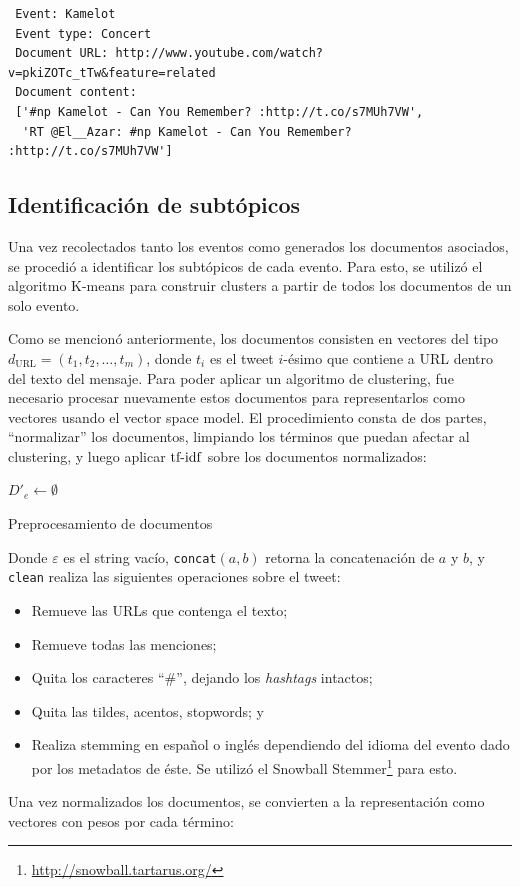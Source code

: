 \begin{verbatim}
 Event: Kamelot
 Event type: Concert
 Document URL: http://www.youtube.com/watch?v=pkiZOTc_tTw&feature=related
 Document content:
 ['#np Kamelot - Can You Remember? :http://t.co/s7MUh7VW',
  'RT @El__Azar: #np Kamelot - Can You Remember? :http://t.co/s7MUh7VW']
\end{verbatim}


\subsection{Identificación de subtópicos}
\label{sec-4.2.2}


    Una vez recolectados tanto los eventos como generados los
    documentos asociados, se procedió a identificar los subtópicos de
    cada evento. Para esto, se utilizó el algoritmo K-means para
    construir clusters a partir de todos los documentos de un solo
    evento.

    Como se mencionó anteriormente, los documentos consisten en
    vectores del tipo $d_{\textrm{URL}}=(t_1,t_2,\ldots,t_m)$, donde
    $t_i$ es el tweet $i$-ésimo que contiene a URL dentro del texto
    del mensaje. Para poder aplicar un algoritmo de clustering, fue
    necesario procesar nuevamente estos documentos para representarlos
    como vectores usando el vector space model. El procedimiento
    consta de dos partes, ``normalizar'' los documentos, limpiando los
    términos que puedan afectar al clustering, y luego aplicar
    $\operatorname{tf-idf}$ sobre los documentos normalizados:

\begin{algorithm}[H]
 $D'_e \leftarrow \emptyset$\;
 \caption{Preprocesamiento de documentos}
\end{algorithm}

    Donde $\varepsilon$ es el string vacío, \texttt{concat}$(a,b)$ retorna
    la concatenación de $a$ y $b$, y \texttt{clean} realiza las siguientes
    operaciones sobre el tweet:

\begin{itemize}
\item Remueve las URLs que contenga el texto;
\item Remueve todas las menciones;
\item Quita los caracteres ``\#'', dejando los \emph{hashtags} intactos;
\item Quita las tildes, acentos, stopwords; y
\item Realiza stemming en español o inglés dependiendo del idioma del
      evento dado por los metadatos de éste. Se utilizó el Snowball
      Stemmer\footnote{\href{http://snowball.tartarus.org/}{http://snowball.tartarus.org/} } para esto.
\end{itemize}
    Una vez normalizados los documentos, se convierten a la
    representación como vectores con pesos por cada término:

